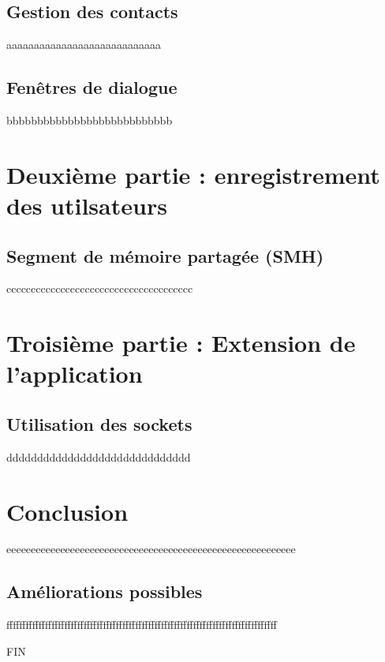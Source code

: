 \documentclass{rapport}
\begin{document}
\subsection{Gestion des contacts}

aaaaaaaaaaaaaaaaaaaaaaaaaaaa

\subsection{Fenêtres de dialogue}

bbbbbbbbbbbbbbbbbbbbbbbbbbb

\newpage

\section{Deuxième partie : enregistrement des utilsateurs}

\subsection{Segment de mémoire partagée (SMH)}

cccccccccccccccccccccccccccccccccccccc

\section{Troisième partie : Extension de l'application}

\subsection{Utilisation des sockets}

dddddddddddddddddddddddddddddd

 \newpage

\section{Conclusion}

eeeeeeeeeeeeeeeeeeeeeeeeeeeeeeeeeeeeeeeeeeeeeeeeeeeeeeeeeee

\subsection{Améliorations possibles}

ffffffffffffffffffffffffffffffffffffffffffffffffffffffffffffffffffffffffffffffffffff

FIN
\end{document}
